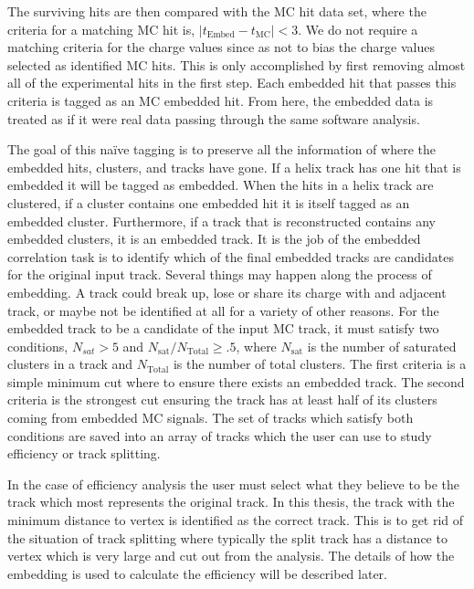 The surviving hits are then compared with the MC hit data set, where the criteria for a matching MC hit is, $\left|t_{\mathrm{Embed} } - t_{\mathrm{MC} }\right| < 3$.  We do not require a matching criteria for the charge values since as not to bias the charge values selected as identified MC hits.  This is only accomplished by first removing almost all of the experimental hits in the first step. Each embedded hit that passes this criteria is tagged as an MC embedded hit. From here, the embedded data is treated as if it were real data passing through the same software analysis. 

The goal of this na\"ive tagging is to preserve all the information of where the embedded hits, clusters, and tracks have gone. If a helix track has one hit that is embedded it will be tagged as embedded. When the hits in a helix track are clustered, if a cluster contains one embedded hit it is itself tagged as an embedded cluster. Furthermore, if a track that is reconstructed contains any embedded clusters, it is an embedded track.  It is the job of the embedded correlation task is to identify which of the final embedded tracks are candidates for the original input track. Several things may happen along the process of embedding. A track could break up, lose or share its charge with and adjacent track, or maybe not be identified at all for a variety of other reasons. For the embedded track to be a candidate of the input MC track, it must satisfy two conditions, $N_{sat} > 5$ and $N_{\mathrm{sat}}/N_{\mathrm{Total}} \geq .5$, where $N_{\mathrm{sat}}$ is the number of saturated clusters in a track and $N_{\mathrm{Total}}$ is the number of total clusters. The first criteria is a simple minimum cut where to ensure there exists an embedded track. The second criteria is the strongest cut ensuring the track has at least half of its clusters coming from embedded MC signals. The set of tracks which satisfy both conditions are saved into an array of tracks which the user can use to study efficiency or track splitting. 

In the case of efficiency analysis the user must select what they believe to be the track which most represents the original track. In this thesis, the track with the minimum distance to vertex is identified as the correct track. This is to get rid of the situation of track splitting where typically the split track has a distance to vertex which is very large and cut out from the analysis. The details of how the embedding is used to calculate the efficiency will be described later. 




